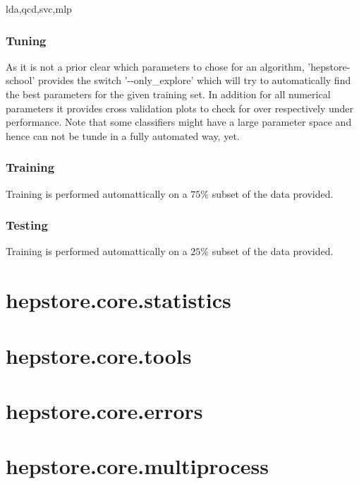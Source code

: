 lda,qcd,svc,mlp

\subsubsection{Tuning}

As it is not a prior clear which parameters to chose for an algorithm,
'hepstore-school' provides the switch '-{}-only\_explore' which will
try to automatically find the best parameters for the given training
set. In addition for all numerical parameters it provides cross
validation plots to check for over respectively under
performance. Note that some classifiers might have a large parameter
space and hence can not be tunde in a fully automated way, yet.

\subsubsection{Training}

Training is performed automattically on a $75\%$ subset of the data provided.

\subsubsection{Testing}

Training is performed automattically on a $25\%$ subset of the data provided.

\section{hepstore.core.statistics}

\section{hepstore.core.tools}

\section{hepstore.core.errors}

\section{hepstore.core.multiprocess}
